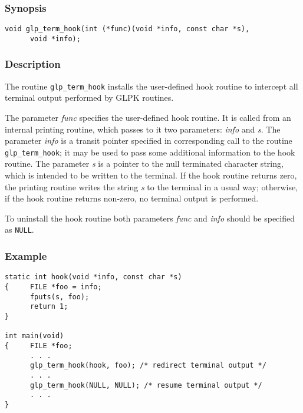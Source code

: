 \subsubsection*{Synopsis}

\begin{verbatim}
void glp_term_hook(int (*func)(void *info, const char *s),
      void *info);
\end{verbatim}

\subsubsection*{Description}

The routine \verb|glp_term_hook| installs the user-defined hook routine
to intercept all terminal output performed by GLPK routines.


The parameter {\it func} specifies the user-defined hook routine. It is
called from an internal printing routine, which passes to it two
parameters: {\it info} and {\it s}. The parameter {\it info} is a
transit pointer specified in corresponding call to the routine
\verb|glp_term_hook|; it may be used to pass some additional information
to the hook routine. The parameter {\it s} is a pointer to the null
terminated character string, which is intended to be written to the
terminal. If the hook routine returns zero, the printing routine writes
the string {\it s} to the terminal in a usual way; otherwise, if the
hook routine returns non-zero, no terminal output is performed.

To uninstall the hook routine both parameters {\it func} and {\it info}
should be specified as \verb|NULL|.

\subsubsection*{Example}

\begin{footnotesize}
\begin{verbatim}
static int hook(void *info, const char *s)
{     FILE *foo = info;
      fputs(s, foo);
      return 1;
}

int main(void)
{     FILE *foo;
      . . .
      glp_term_hook(hook, foo); /* redirect terminal output */
      . . .
      glp_term_hook(NULL, NULL); /* resume terminal output */
      . . .
}
\end{verbatim}
\end{footnotesize}

